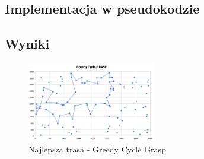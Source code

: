 \documentclass[a4paper 10pt]{article}
\begin{document}
\subsection{Implementacja w pseudokodzie}
\subsection{Wyniki}

\begin{figure} [H]
\centering
\includegraphics[angle=0,width = 0.5\textwidth, height=!]{images/GCG.png}
\caption{Najlepsza trasa - Greedy Cycle Grasp}
\label{Rys. GGC}
\end{figure}
\end{document}
